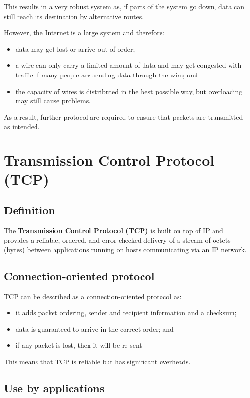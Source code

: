 \documentclass[a4paper]{systems-software}
\begin{document}
This results in a very robust system as, if parts of the system go down, data can still reach its destination by alternative routes.

However, the Internet is a large system and therefore:
\begin{itemize}
	\item data may get lost or arrive out of order;
	\item a wire can only carry a limited amount of data and may get congested with traffic if many people are sending data through the wire; and
	\item the capacity of wires is distributed in the best possible way, but overloading may still cause problems.
\end{itemize}
As a result, further protocol are required to ensure that packets are transmitted as intended.


\section*{Transmission Control Protocol (TCP)}

\subsection*{Definition}

The \textbf{Transmission Control Protocol (TCP)} is built on top of IP and provides a reliable, ordered, and error-checked delivery of a stream of octets (bytes) between applications running on hosts communicating via an IP network.


\subsection*{Connection-oriented protocol}

TCP can be described as a connection-oriented protocol as:
\begin{itemize}
	\item it adds packet ordering, sender and recipient information and a checksum;
	\item data is guaranteed to arrive in the correct order; and
	\item if any packet is lost, then it will be re-sent.
\end{itemize}

This means that TCP is reliable but has significant overheads.


\subsection*{Use by applications}
\end{document}
